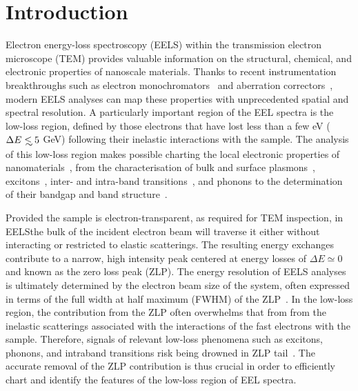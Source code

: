 \section{Introduction}
\label{sec:introduction}

Electron energy-loss spectroscopy (EELS) within the transmission electron microscope (TEM) provides
valuable information on the structural, chemical, and electronic properties of nanoscale materials.
%
Thanks to recent instrumentation breakthroughs
such as electron monochromators~\cite{Terauchi:2005, Freitag:2005} and aberration correctors~\cite{Haider:1998},
modern EELS analyses can map these properties with unprecedented spatial and spectral resolution.
%
A particularly important region of the EEL spectra is
the low-loss region, defined by those electrons that have lost
less than a few eV ($\Delta E\lsim 5$ GeV) following their inelastic interactions
with the sample.
%
The analysis of this low-loss region makes possible charting the local
electronic properties of nanomaterials~\cite{Geiger:1967}, from the characterisation of
bulk and surface plasmons~\cite{Schaffer:2008}, excitons~\cite{Erni:2005}, 
inter- and intra-band transitions~\cite{Rafferty:1998},
and phonons to the determination of their bandgap and band structure~\cite{Stoger:2008}.

Provided the sample is electron-transparent, as required for TEM inspection,
in EELSthe bulk of the incident electron beam will traverse it
either without interacting or restricted to elastic scatterings.
%
The resulting energy exchanges contribute to a narrow,
 high intensity peak centered at energy losses
of $\Delta E\simeq 0$ and known as the zero loss peak (ZLP).
%
The energy resolution of EELS analyses is ultimately determined by
the electron beam size of the system, often expressed in terms
of the full width at half maximum (FWHM) of the
ZLP~\cite{Egerton:2009}.
%
In the low-loss region, the contribution from the ZLP
often overwhelms that from 
from the inelastic scatterings associated with the interactions of the fast electrons
with the sample.
%
Therefore, signals of relevant low-loss phenomena such as excitons,
phonons, and intraband transitions risk being drowned
in ZLP tail~\cite{Abajo:2010}.
%
The accurate removal of the ZLP
contribution is thus crucial  in order to efficiently chart and identify the  features
of the low-loss  region of EEL spectra. 

